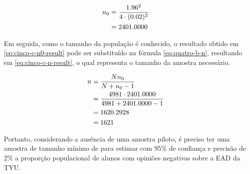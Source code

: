 \begin{align}
	n_0 
	    &= \frac{1.96^2}{4 \cdot (0.02)^2} \nonumber \\
	    &= \label{eq:cinco-c-n0-result}
	       2401.0000
\end{align}

Em seguida, como o tamanho da população é conhecido, o resultado obtido em \eqref{eq:cinco-c-n0-result} pode ser substituído na fórmula \eqref{eq:quatro-b-n}, resultando em \eqref{eq:cinco-c-n-result}, o qual representa o tamanho da amostra necessário.

\begin{align}
	n &= \frac{N n_0}{N + n_0 - 1} \nonumber \\
	  &= \frac{4981 \cdot 2401.0000}{4981 + 2401.0000 - 1} \nonumber \\
	  &= 1620.2928 \nonumber \\
	  &= \label{eq:cinco-c-n-result} 
	     1621
\end{align}

Portanto, considerando a ausência de uma amostra piloto, é preciso ter uma amostra de tamanho mínimo de \CINCOCnceil para estimar com $95\%$ de confiança e precisão de $2\%$ a proporção populacional de alunos com opiniões negativas sobre a EAD da TYU.